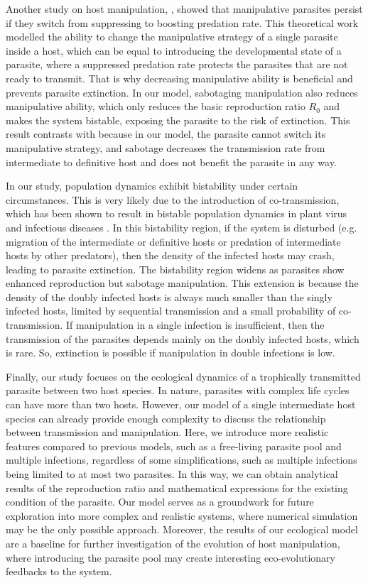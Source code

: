 \documentclass[a4paper]{scrartcl}
\begin{document}
Another study on host manipulation, \cite{Iritani2018}, showed that manipulative parasites persist if they switch from suppressing to boosting predation rate.
This theoretical work modelled the ability to change the manipulative strategy of a single parasite inside a host, which can be equal to introducing the developmental state of a parasite, where a suppressed predation rate protects the parasites that are not ready to transmit.
That is why decreasing manipulative ability is beneficial and prevents parasite extinction.
In our model, sabotaging manipulation also reduces manipulative ability, which only reduces the basic reproduction ratio $R_0$ and makes the system bistable, exposing the parasite to the risk of extinction. 
This result contrasts with \cite{Iritani2018} because in our model, the parasite cannot switch its manipulative strategy, and sabotage decreases the transmission rate from intermediate to definitive host and does not benefit the parasite in any way. 

In our study, population dynamics exhibit bistability under certain circumstances. 
This is very likely due to the introduction of co-transmission, which has been shown to result in bistable population dynamics in plant virus \cite{allen_modelling_2019} and infectious diseases \cite{gao_coinfection_2016-1}.
 In this bistability region, if the system is disturbed (e.g. migration of the intermediate or definitive hosts or predation of intermediate hosts by other predators), then the density of the infected hosts may crash, leading to parasite extinction. 
The bistability region widens as parasites show enhanced reproduction but sabotage manipulation. 
This extension is because the density of the doubly infected hosts is always much smaller than the singly infected hosts, limited by sequential transmission and a small probability of co-transmission. 
If manipulation in a single infection is insufficient, then the transmission of the parasites depends mainly on the doubly infected hosts, which is rare. 
So, extinction is possible if manipulation in double infections is low.

Finally, our study focuses on the ecological dynamics of a trophically transmitted parasite between two host species. 
In nature, parasites with complex life cycles can have more than two hosts. 
However, our model of a single intermediate host species can already provide enough complexity to discuss the relationship between transmission and manipulation.
Here, we introduce more realistic features compared to previous models, such as a free-living parasite pool and multiple infections, regardless of some simplifications, such as multiple infections being limited to at most two parasites. 
In this way, we can obtain analytical results of the reproduction ratio and mathematical expressions for the existing condition of the parasite. 
Our model serves as a groundwork for future exploration into more complex and realistic systems, where numerical simulation may be the only possible approach.
Moreover, the results of our ecological model are a baseline for further investigation of the evolution of host manipulation, where introducing the parasite pool may create interesting eco-evolutionary feedbacks to the system.
\end{document}
